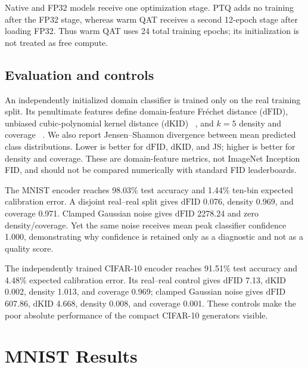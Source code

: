 \documentclass[conference]{IEEEtran}
\newcommand{\dfid}{\ensuremath{\mathrm{dFID}}}
\newcommand{\dkid}{\ensuremath{\mathrm{dKID}}}
\begin{document}
Native and FP32 models receive one optimization stage. PTQ adds no training after
the FP32 stage, whereas warm QAT receives a second 12-epoch stage after loading
FP32. Thus warm QAT uses 24 total training epochs; its initialization is not
treated as free compute.

\subsection{Evaluation and controls}

An independently initialized domain classifier is trained only on the real
training split. Its penultimate features define domain-feature Fr\'echet distance
(\dfid), unbiased cubic-polynomial kernel distance (\dkid)
~\cite{binkowski2018kid}, and $k=5$ density and coverage
~\cite{naeem2020density}. We also report Jensen--Shannon divergence between mean
predicted class distributions. Lower is better for \dfid, \dkid, and JS; higher
is better for density and coverage. These are domain-feature metrics, not
ImageNet Inception FID, and should not be compared numerically with standard FID
leaderboards.

The MNIST encoder reaches 98.03\% test accuracy and 1.44\% ten-bin expected
calibration error. A disjoint real--real split gives \dfid{} 0.076, density
0.969, and coverage 0.971. Clamped Gaussian noise gives \dfid{} 2278.24 and zero
density/coverage. Yet the same noise receives mean peak classifier confidence
1.000, demonstrating why confidence is retained only as a diagnostic and not as a
quality score.

The independently trained CIFAR-10 encoder reaches 91.51\% test accuracy and
4.48\% expected calibration error. Its real--real control gives \dfid{} 7.13,
\dkid{} 0.002, density 1.013, and coverage 0.969; clamped Gaussian noise gives
\dfid{} 607.86, \dkid{} 4.668, density 0.008, and coverage 0.001. These controls
make the poor absolute performance of the compact CIFAR-10 generators visible.

\section{MNIST Results}
\end{document}
